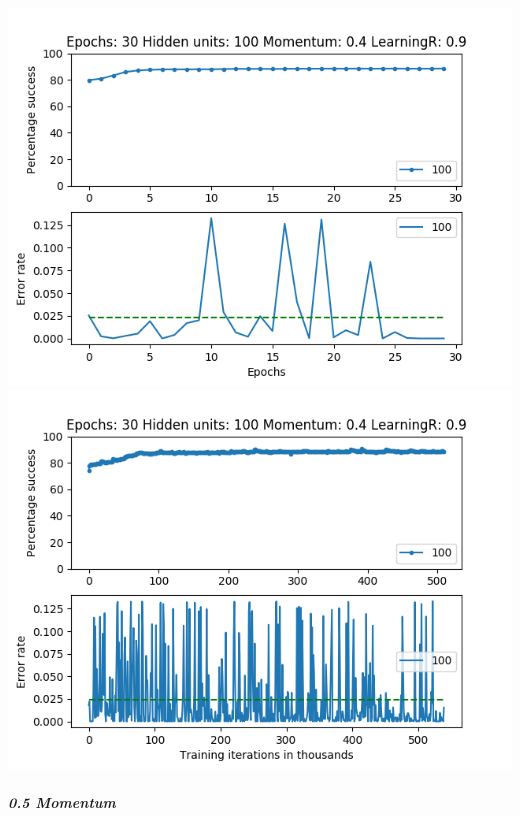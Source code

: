 \documentclass[11pt]{article}
\makeatletter
\def\maxwidth{\ifdim\Gin@nat@width>\linewidth\linewidth
    \else\Gin@nat@width\fi}
\let\Oldincludegraphics\includegraphics
\renewcommand{\includegraphics}[1]{\Oldincludegraphics[width=.8\maxwidth]{#1}}
\makeatother
\begin{document}
\includegraphics{Experiment2/E2_NN_Epoch_Momentum_0.4_30Epochs_100Hiddenunits.png}
\includegraphics{Experiment2/E2_NN_Training_Momentum_0.4_30Epochs_100Hiddenunits.png}

\hypertarget{momentum-5}{%
\subparagraph{0.5 Momentum}\label{momentum-5}}
\end{document}
